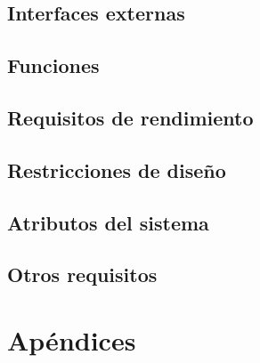 \subsection{Interfaces externas}

\subsection{Funciones}

\subsection{Requisitos de rendimiento}

\subsection{Restricciones de diseño}

\subsection{Atributos del sistema}

\subsection{Otros requisitos}

\section{Apéndices}
